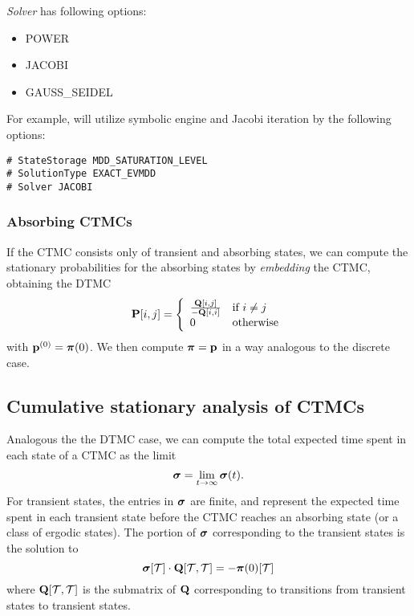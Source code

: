 \emph{Solver} has following options:
\begin{itemize}
\item POWER
\item JACOBI
\item GAUSS\_SEIDEL
\end{itemize}

For example, {\smart} will utilize symbolic engine and Jacobi iteration by the following options:

\begin{verbatim}
# StateStorage MDD_SATURATION_LEVEL
# SolutionType EXACT_EVMDD
# Solver JACOBI
\end{verbatim}


\subsubsection{Absorbing CTMCs}

If the CTMC consists only of transient and absorbing states,
we can compute the stationary probabilities
for the absorbing states by \emph{embedding} the CTMC, obtaining the DTMC
\[
  \P[i,j] = \left\{ \begin{array}{ll} %
             \frac{\Q[i,j]}{-\Q[i,i]}
             &
             \mbox{if $i\neq j$}
             \\
             0
             &
             \mbox{otherwise}
                  \end{array} \right.
\]
with $\mathbf{p}^{(0)} = \mbox{\boldmath{${\pi}$}}(0)$.
We then compute $\mbox{\boldmath{${\pi}$}} = \mathbf{p}$ in a way analogous to the
discrete case.

\subsection{Cumulative stationary analysis of CTMCs}
Analogous the the DTMC case, we can compute the total expected time spent in
each state of a CTMC as the limit
\[
\mbox{\boldmath{${\sigma}$}} = \lim_{t \rightarrow \infty} \mbox{\boldmath{${\sigma}$}}(t).
\]
For transient states, the entries in $\mbox{\boldmath{${\sigma}$}}$ are finite,
and represent the expected time spent in each transient state before
the CTMC reaches an absorbing state (or a class of ergodic states).
The portion of $\mbox{\boldmath{${\sigma}$}}$ corresponding to the transient states is the
solution to
\begin{equation}
  \mbox{\boldmath{${\sigma}$}}[\mathcal{T}] \cdot \mathbf{Q}[\mathcal{T}, \mathcal{T}]
  = -\mbox{\boldmath{${\pi}$}}(0)[\mathcal{T}]
  \label{LS:absCTMC}
\end{equation}
where $\mathbf{Q}[\mathcal{T}, \mathcal{T}]$ is the submatrix of $\mathbf{Q}$
corresponding to transitions from transient states to transient states.

